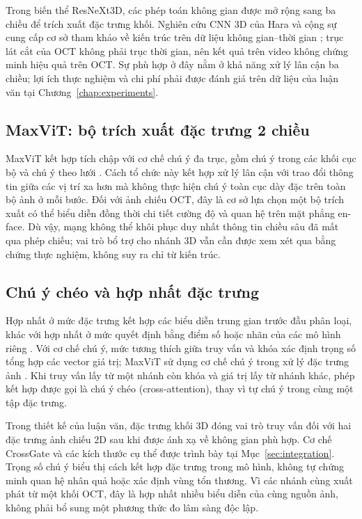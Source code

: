 \documentclass[14pt,a4paper,oneside]{extreport}
\begin{document}
Trong biến thể ResNeXt3D, các phép toán không gian được mở rộng sang
ba chiều để trích xuất đặc trưng khối. Nghiên cứu CNN 3D của Hara và
cộng sự cung cấp cơ sở tham khảo về kiến trúc trên dữ liệu không
gian--thời gian \cite{hara2018spatiotemporal}; trục lát cắt của OCT
không phải trục thời gian, nên kết quả trên video không chứng minh
hiệu quả trên OCT. Sự phù hợp ở đây nằm ở khả năng xử lý lân cận ba
chiều; lợi ích thực nghiệm và chi phí phải được đánh giá trên dữ liệu
của luận văn tại Chương~\ref{chap:experiments}.

\subsection{MaxViT: bộ trích xuất đặc trưng 2 chiều}
MaxViT kết hợp tích chập với cơ chế chú ý đa trục, gồm chú ý trong
các khối cục bộ và chú ý theo lưới \cite{tu2022maxvit}. Cách tổ chức
này kết hợp xử lý lân cận với trao đổi thông tin giữa các vị trí xa
hơn mà không thực hiện chú ý toàn cục dày đặc trên toàn bộ ảnh ở mỗi
bước. Đối với ảnh chiếu OCT, đây là cơ sở lựa chọn một bộ trích xuất
có thể biểu diễn đồng thời chi tiết cường độ và quan hệ trên mặt
phẳng en-face. Dù vậy, mạng không thể khôi phục duy nhất thông tin
chiều sâu đã mất qua phép chiếu; vai trò bổ trợ cho nhánh 3D vẫn cần
được xem xét qua bằng chứng thực nghiệm, không suy ra chỉ từ kiến trúc.

\subsection{Chú ý chéo và hợp nhất đặc trưng}
Hợp nhất ở mức đặc trưng kết hợp các biểu diễn trung gian trước đầu
phân loại, khác với hợp nhất ở mức quyết định bằng điểm số hoặc nhãn
của các mô hình riêng \cite{baltrusaitis2017multimodal}. Với cơ chế
chú ý, mức tương thích giữa truy vấn và khóa xác định trọng số tổng
hợp các vector giá trị; MaxViT sử dụng cơ chế chú ý trong xử lý đặc
trưng ảnh \cite{tu2022maxvit}. Khi truy vấn lấy từ một nhánh còn khóa
và giá trị lấy từ nhánh khác, phép kết hợp được gọi là chú ý chéo
(cross-attention), thay vì tự chú ý trong cùng một tập đặc trưng.

Trong thiết kế của luận văn, đặc trưng khối 3D đóng vai trò truy vấn
đối với hai đặc trưng ảnh chiếu 2D sau khi được ánh xạ về không gian
phù hợp. Cơ chế CrossGate và các kích thước cụ thể được trình bày tại
Mục~\ref{sec:integration}. Trọng số chú ý biểu thị cách kết hợp đặc
trưng trong mô hình, không tự chứng minh quan hệ nhân quả hoặc xác
định vùng tổn thương. Vì các nhánh cùng xuất phát từ một khối OCT,
đây là hợp nhất nhiều biểu diễn của cùng nguồn ảnh, không phải bổ
sung một phương thức đo lâm sàng độc lập.
\end{document}
